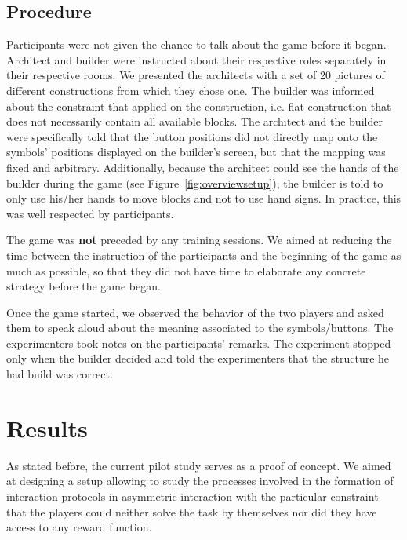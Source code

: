\subsection{Procedure}
\label{sec:procedure}
Participants were not given the chance to talk about the game before it began. Architect and builder were instructed about their respective roles separately in their respective rooms. We presented the architects with a set of 20 pictures of different constructions from which they chose one. The builder was informed about the constraint that applied on the construction, i.e. flat construction that does not necessarily contain all available blocks. The architect and the builder were specifically told that the button positions did not directly map onto the symbols' positions displayed on the builder's screen, but that the mapping was fixed and arbitrary. Additionally, because the architect could see the hands of the builder during the game (see Figure~\ref{fig:overviewsetup}), the builder is told to only use his/her hands to move blocks and not to use hand signs. In practice, this was well respected by participants.

The game was \textbf{not} preceded by any training sessions. We aimed at reducing the time between the instruction of the participants and the beginning of the game as much as possible, so that they did not have time to elaborate any concrete strategy before the game began.

Once the game started, we observed the behavior of the two players and asked them to speak aloud about the meaning associated to the symbols/buttons. The experimenters took notes on the participants' remarks. The experiment stopped only when the builder decided and told the experimenters that the structure he had build was correct.


\section{Results}

As stated before, the current pilot study serves as a proof of concept. We aimed at designing a setup allowing to study the processes involved in the formation of interaction protocols in asymmetric interaction with the particular constraint that the players could neither solve the task by themselves nor did they have access to any reward function.

